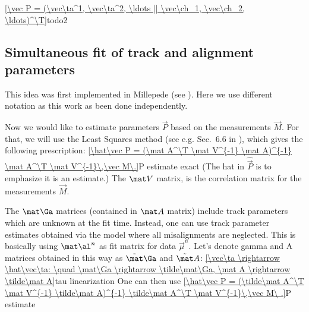 \eqref{\vec P = (\vec\ta^1, \vec\ta^2, \ldots || \vec\ch_1, \vec\ch_2, \ldots)^\T}{todo2}



\subsection{Simultaneous fit of track and alignment parameters}

This idea was first implemented in Millepede (see ). Here we use different notation as this work as been done independently.

Now we would like to estimate parameters $\vec P$ based on the measurements $\vec M$. For that, we will use the Least Squares method (see e.g. Sec.~6.6 in ), which gives the following prescription:
\eqref{\hat\vec P = (\mat A^\T \mat V^{-1} \mat A)^{-1} \mat A^\T \mat V^{-1}\,\vec M\.}{P estimate exact}
(The hat in $\hat\vec P$ is to emphasize it is an estimate.) The $\mat V$ matrix, is the correlation matrix for the measurements $\vec M$.

The $\mat\Ga$ matrices (contained in $\mat A$ matrix) include track parameters which are unknown at the fit time. Instead, one can use track parameter estimates obtained via the model where all misalignments are neglected. This is basically using $\mat \al^n$ as fit matrix for data $\vec \mu^n$. Let's denote gamma and A matrices obtained in this way as $\tilde\mat\Ga$ and $\tilde\mat A$:
\eqref{\vec\ta \rightarrow \hat\vec\ta: \quad \mat\Ga \rightarrow \tilde\mat\Ga, \mat A \rightarrow \tilde\mat A}{tau linearization}
 One can then use
\eqref{\hat\vec P = (\tilde\mat A^\T \mat V^{-1} \tilde\mat A)^{-1} \tilde\mat A^\T \mat V^{-1}\,\vec M\ .}{P estimate}

